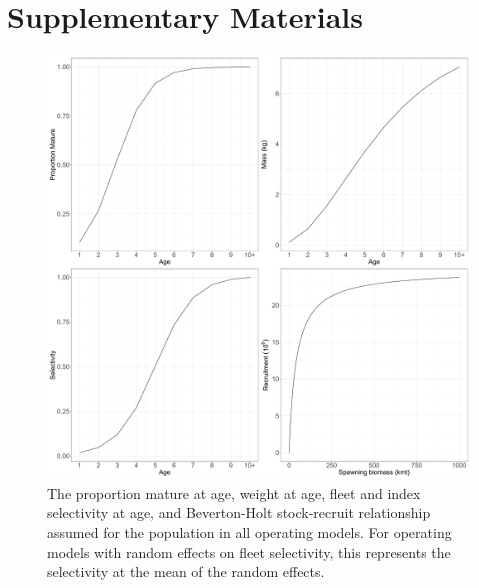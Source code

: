 \documentclass[
  12pt,
]{article}
\begin{document}
\section*{Supplementary Materials}\label{supplementary-materials}

\pagebreak

\begin{figure}[!ht]
\begin{center}
\includegraphics[width = \textwidth]{om_input_plots_figure}
\end{center}
\caption{The proportion mature at age, weight at age, fleet and index selectivity at age, and Beverton-Holt stock-recruit relationship assumed for the population in all operating models. For operating models with random effects on fleet selectivity, this represents the selectivity at the mean of the random effects.}\label{om_inputs_fig}
\end{figure}
\end{document}
